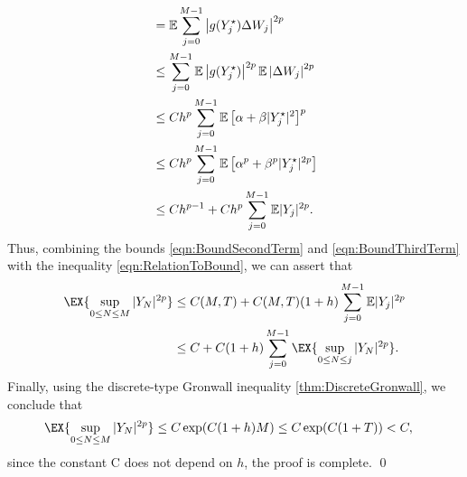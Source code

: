\begin{pf}
\begin{align}
		&=
			\mathbb{E}\sum_{j=0}^{M-1}
					\left|
						g(Y_j^{\star})\Delta W_j
					\right|^{2p}
			\notag\\
		&\leq	
			\sum_{j=0}^{M-1}
				\mathbb{E}\left|
						g(Y_j^{\star})
					\right|^{2p}
				\mathbb{E}\left|
						\Delta W_j
					\right|^{2p}
			\notag \\
		&\leq
			C h^p
			\sum_{j=0}^{M-1}
			\mathbb{E}\left[
					\alpha +\beta|Y^{\star}_j|^2
				\right]^p
			\notag\\
		&\leq
			Ch^p
			\sum_{j=0}^{M-1}
			\mathbb{E}\left[
					\alpha ^p +\beta^p |Y^{\star}_j|^{2p}
				\right]
			\notag\\
		&\leq
		Ch^{p-1}
		+
		Ch^p \sum_{j=0}^{M-1}
			\mathbb{E}|Y_j|^{2p} \label{eqn:BoundThirdTerm}.
	\end{align}
	Thus, combining the bounds \eqref{eqn:BoundSecondTerm} and \eqref{eqn:BoundThirdTerm} with the inequality 
	\eqref{eqn:RelationToBound}, we can assert that
	\begin{align}
		\EX{
			\sup_{0\leq N \leq M}
					|Y_N|^{2p} 
		}
		&\leq
			C(M,T) + C(M,T)(1+h)
			\sum_{j=0}^{M-1}
				\m|Y_j|^{2p}  
			\notag \\
		&\leq	
			C +C(1+h) 
			\sum_{j=0}^{M-1}
				\EX{
					\sup_{0\leq N \leq j}
					|Y_N|^{2p}
				}	
		.
	\end{align}
	Finally, using the discrete-type Gronwall inequality \eqref{thm:DiscreteGronwall}, we conclude that
	\begin{align*}
		\EX{
			\sup_{0\leq N \leq M}
			|Y_N|^{2p} 
		}	
		&\leq
			C\exp(C(1+h)M) 
		\leq 
		C \exp(C(1+T))<C,
	\end{align*}
	since the constant C does not depend on $h$, the proof is complete. \qed
\end{pf}
	
